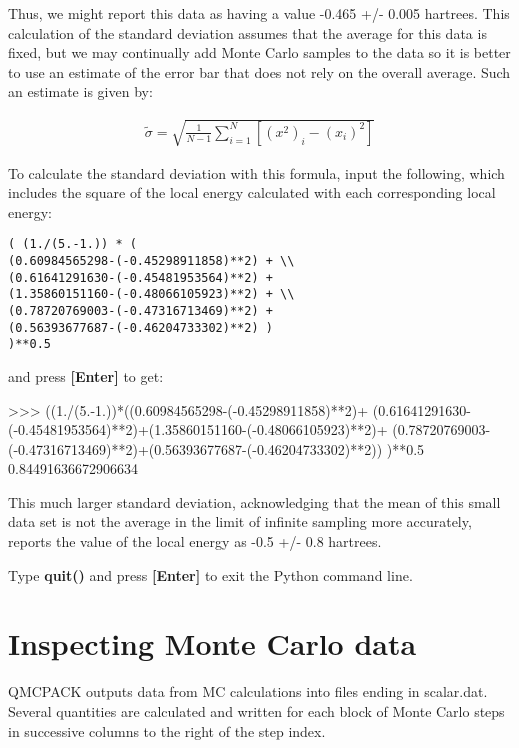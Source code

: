 Thus, we might report this data as having a value -0.465 +/- 0.005 hartrees.
This calculation of the standard deviation assumes that the average for this
data is fixed, but we may continually add Monte Carlo samples to the data so it
is better to use an estimate of the error bar that does not rely on the overall
average.  Such an estimate is given by:

\begin{align}
  \tilde{\sigma} = \sqrt{\frac{1}{N-1}\sum_{i=1}^{N} \left[{(x^2)}_i - ({x_i})^2\right]}
\end{align}

To calculate the standard deviation with this formula, input the following,
which includes the square of the local energy calculated with each
corresponding local energy:

\begin{lstlisting}[style=SHELL]
( (1./(5.-1.)) * ( 
(0.60984565298-(-0.45298911858)**2) + \\
(0.61641291630-(-0.45481953564)**2) + 
(1.35860151160-(-0.48066105923)**2) + \\
(0.78720769003-(-0.47316713469)**2) + 
(0.56393677687-(-0.46204733302)**2) ) 
)**0.5
\end{lstlisting}

and press \textbf{[Enter]} to get:

\begin{shade}
>>> ((1./(5.-1.))*((0.60984565298-(-0.45298911858)**2)+ 
(0.61641291630-(-0.45481953564)**2)+(1.35860151160-(-0.48066105923)**2)+ 
(0.78720769003-(-0.47316713469)**2)+(0.56393677687-(-0.46204733302)**2))
)**0.5
0.84491636672906634
\end{shade}

This much larger standard deviation, acknowledging that the mean of this small
data set is not the average in the limit of infinite sampling more accurately,
reports the value of the local energy as -0.5 +/- 0.8 hartrees.

Type \textbf{quit()} and press \textbf{[Enter]} to exit the Python command line.

\section{Inspecting Monte Carlo data}
\label{sec:inspect_data} 

QMCPACK outputs data from MC calculations into files ending in scalar.dat.
Several quantities are calculated and written for each block of Monte Carlo
steps in successive columns to the right of the step index. 

